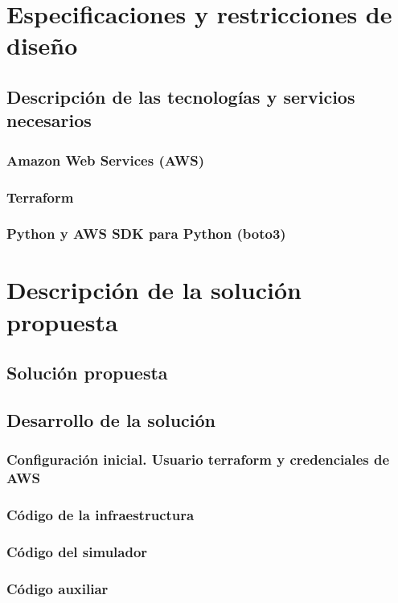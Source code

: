 \documentclass[11pt]{article}
\begin{document}
\section{Especificaciones y restricciones de diseño}
\subsection{Descripción de las tecnologías y servicios necesarios}
\subsubsection{Amazon Web Services (AWS)}
\subsubsection{Terraform}
\subsubsection{Python y AWS SDK para Python (boto3)}


\section{Descripción de la solución propuesta}
\subsection{Solución propuesta}
\subsection{Desarrollo de la solución}
\subsubsection{Configuración inicial. Usuario terraform y credenciales de AWS}
\subsubsection{Código de la infraestructura}
\subsubsection{Código del simulador}
\subsubsection{Código auxiliar}
\end{document}
